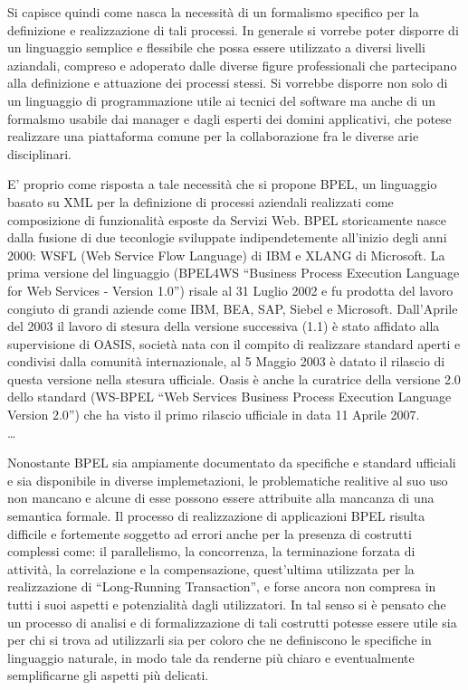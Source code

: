 Si capisce quindi come nasca la necessità di un formalismo specifico per la
definizione e realizzazione di tali processi. In generale si vorrebe poter
disporre di un linguaggio semplice e flessibile che possa essere utilizzato a
diversi livelli aziandali, compreso e adoperato dalle diverse figure
professionali che partecipano alla definizione e attuazione dei processi
stessi. Si vorrebbe disporre non solo di un linguaggio di programmazione
utile ai tecnici del software ma anche di un formalsmo usabile dai manager e
dagli esperti dei domini applicativi, che potese realizzare una piattaforma comune
per la collaborazione fra le diverse arie disciplinari.

E' proprio come risposta a tale necessità che si propone BPEL, un linguaggio
basato su XML per la definizione di processi aziendali realizzati come
composizione di funzionalità esposte da Servizi Web. BPEL storicamente nasce
dalla fusione di due teconlogie sviluppate indipendetemente all'inizio degli
anni 2000: WSFL (Web Service Flow Language) di IBM e XLANG di Microsoft. La
prima versione del linguaggio (BPEL4WS ``Business Process Execution Language for Web Services - Version 1.0'')
risale al 31 Luglio 2002 e fu prodotta del lavoro congiuto di grandi
aziende come IBM, BEA, SAP, Siebel e Microsoft. Dall'Aprile del 2003 il lavoro
di stesura della versione successiva (1.1) è stato affidato alla supervisione di
OASIS, società nata con il compito di realizzare standard aperti e condivisi
dalla comunità internazionale, al 5 Maggio 2003 è datato il rilascio di questa
versione nella stesura ufficiale. Oasis è  anche la curatrice della
versione 2.0 dello standard (WS-BPEL ``Web Services Business Process Execution
Language Version 2.0'') che ha visto il primo rilascio ufficiale in data
11 Aprile 2007.
\\
\ldots
\newpage

Nonostante BPEL sia ampiamente documentato da specifiche e standard ufficiali e
sia disponibile in diverse implemetazioni, le problematiche realitive al suo
uso non mancano e alcune di esse possono essere attribuite alla
mancanza di una semantica formale. Il processo di realizzazione di applicazioni BPEL
risulta difficile e fortemente soggetto ad errori anche per la presenza di
costrutti complessi come: il parallelismo, la concorrenza, la terminazione
forzata di attività, la correlazione e la compensazione, quest'ultima utilizzata
per la realizzazione di ``Long-Running Transaction'', e forse ancora non 
compresa in tutti i suoi aspetti e potenzialità dagli utilizzatori. In tal
senso si è pensato che un processo di analisi e di formalizzazione di
tali costrutti potesse essere utile sia per chi si trova ad utilizzarli sia per
coloro che ne definiscono le specifiche in linguaggio naturale, in modo tale da
renderne più chiaro e eventualmente semplificarne gli aspetti più delicati.

